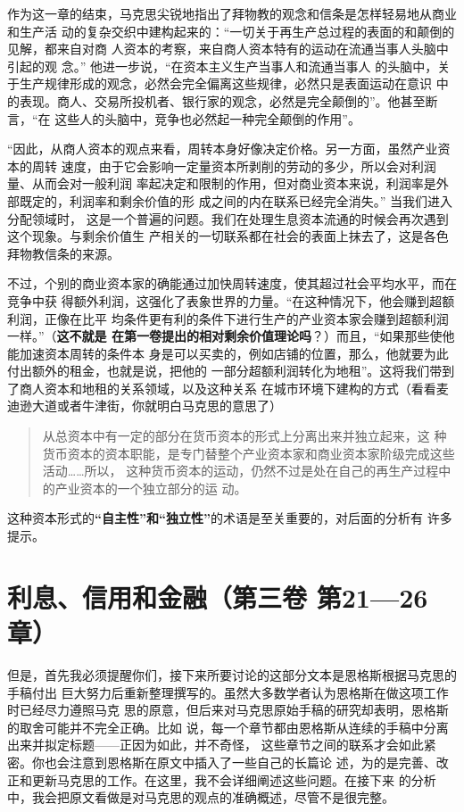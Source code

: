 作为这一章的结束，马克思尖锐地指出了拜物教的观念和信条是怎样轻易地从商业和生产活
动的复杂交织中建构起来的：“一切关于再生产总过程的表面的和颠倒的见解，都来自对商
人资本的考察，来自商人资本特有的运动在流通当事人头脑中引起的观
念。” 他进一步说，“在资本主义生产当事人和流通当事人
的头脑中，关于生产规律形成的观念，必然会完全偏离这些规律，必然只是表面运动在意识
中的表现。商人、交易所投机者、银行家的观念，必然是完全颠倒的”。他甚至断言，“在
这些人的头脑中，竞争也必然起一种完全颠倒的作用”。

“因此，从商人资本的观点来看，周转本身好像决定价格。另一方面，虽然产业资本的周转
速度，由于它会影响一定量资本所剥削的劳动的多少，所以会对利润量、从而会对一般利润
率起决定和限制的作用，但对商业资本来说，利润率是外部既定的，利润率和剩余价值的形
成之间的内在联系已经完全消失。” 当我们进入分配领域时，
这是一个普遍的问题。我们在处理生息资本流通的时候会再次遇到这个现象。与剩余价值生
产相关的一切联系都在社会的表面上抹去了，这是各色拜物教信条的来源。

不过，个别的商业资本家的确能通过加快周转速度，使其超过社会平均水平，而在竞争中获
得额外利润，这强化了表象世界的力量。“在这种情况下，他会赚到超额利润，正像在比平
均条件更有利的条件下进行生产的产业资本家会赚到超额利润一样。”（\textbf{这不就是
在第一卷提出的相对剩余价值理论吗}？）而且，“如果那些使他能加速资本周转的条件本
身是可以买卖的，例如店铺的位置，那么，他就要为此付出额外的租金，也就是说，把他的
一部分超额利润转化为地租”。这将我们带到了商人资本和地租的关系领域，以及这种关系
在城市环境下建构的方式（看看麦迪逊大道或者牛津街，你就明白马克思的意思了）

\begin{quotation}从总资本中有一定的部分在货币资本的形式上分离出来并独立起来，这
种货币资本的资本职能，是专门替整个产业资本家和商业资本家阶级完成这些活动……所以，
这种货币资本的运动，仍然不过是处在自己的再生产过程中的产业资本的一个独立部分的运
动。
\end{quotation}

这种资本形式的\textbf{“自主性”和“独立性”}的术语是至关重要的，对后面的分析有
许多提示。

\chapter{利息、信用和金融（第三卷 第21—26章）}

但是，首先我必须提醒你们，接下来所要讨论的这部分文本是恩格斯根据马克思的手稿付出
巨大努力后重新整理撰写的。虽然大多数学者认为恩格斯在做这项工作时已经尽力遵照马克
思的原意，但后来对马克思原始手稿的研究却表明，恩格斯的取舍可能并不完全正确。比如
说，每一个章节都由恩格斯从连续的手稿中分离出来并拟定标题——正因为如此，并不奇怪，
这些章节之间的联系才会如此紧密。你也会注意到恩格斯在原文中插入了一些自己的长篇论
述，为的是完善、改正和更新马克思的工作。在这里，我不会详细阐述这些问题。在接下来
的分析中，我会把原文看做是对马克思的观点的准确概述，尽管不是很完整。


